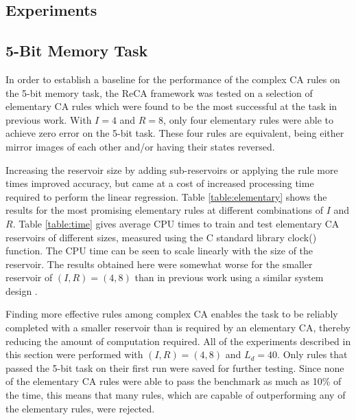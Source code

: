 \documentclass{elsarticle}
\begin{document}
\begin{multicols}{2}
    \section{Experiments}\label{experiment}
\subsection{5-Bit Memory Task}
In order to establish a baseline for the performance of the complex CA rules on 
    the 5-bit memory task, the ReCA framework was tested on a selection of 
    elementary CA rules which were found to be the most successful at the task 
    in previous work\cite{yilmaz2014reservoir}\cite{bye2016investigation}. With 
    $I = 4$ and $R = 8$, only four elementary rules were able to achieve zero 
    error on the 5-bit task. These four rules are equivalent, being either 
    mirror images of each other and/or having their states reversed.\par 
    Increasing the reservoir size by adding sub-reservoirs or applying the rule 
    more times improved accuracy, but came at a cost of increased processing 
    time required to perform the linear regression.  Table 
    \ref{table:elementary} shows the results for the most promising elementary 
    rules at different combinations of $I$ and $R$.  Table \ref{table:time} 
gives average CPU times to train and test elementary CA reservoirs of different 
   sizes, measured using the C standard library clock() function. The CPU time 
   can be seen to scale linearly with the size of the reservoir. The results 
   obtained here were somewhat worse for the smaller reservoir of $(I,R) = 
   (4,8)$ than in previous work using a similar system design  
   \cite{yilmaz2014reservoir}\cite{bye2016investigation}\cite{nichele2017reservoir}.  
   \par Finding more effective rules among complex CA enables the task to be 
   reliably completed with a smaller reservoir than is required by an 
   elementary CA, thereby reducing the amount of computation required.  All of 
   the experiments described in this section were performed with $(I,R) = 
   (4,8)$ and $L_{d} = 40$.  Only rules that passed the 5-bit task on their 
   first run were saved for further testing.  Since none of the elementary CA 
   rules were able to pass the benchmark as much as 10\% of the time, this 
   means that many rules, which are capable of outperforming any of the 
   elementary rules, were rejected. 



\end{multicols}
\end{document}
